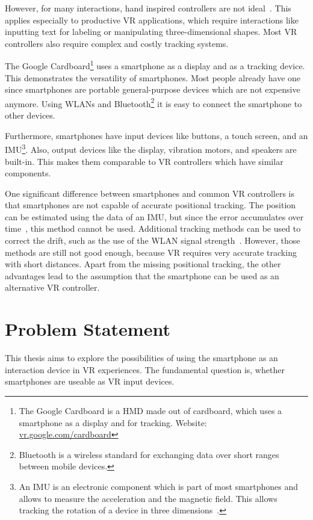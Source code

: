 However, for many interactions, hand inspired controllers are not ideal~\cite{Bowman.2012}. This applies especially to productive \gls{VR} applications, which require interactions like inputting text for labeling or manipulating three-dimensional shapes. Most \gls{VR} controllers also require complex and costly tracking systems.

The Google Cardboard\footnote{The Google Cardboard is a \gls{HMD} made out of cardboard, which uses a smartphone as a display and for tracking. Website: \href{https://vr.google.com/cardboard/}{vr.google.com/cardboard}} uses a smartphone as a display and as a tracking device. This demonstrates the versatility of smartphones. Most people already have one since smartphones are portable general-purpose devices which are not expensive anymore. Using \glspl{WLAN} and Bluetooth\footnote{Bluetooth is a wireless standard for exchanging data over short ranges between mobile devices.} it is easy to connect the smartphone to other devices.

Furthermore, smartphones have input devices like buttons, a touch screen, and an \gls{IMU}\footnote{An IMU is an electronic component which is part of most smartphones and allows to measure the acceleration and the magnetic field. This allows tracking the rotation of a device in three dimensions~\cite[139]{Katzakis.2010}.}. Also, output devices like the display, vibration motors, and speakers are built-in. This makes them comparable to \gls{VR} controllers which have similar components.

One significant difference between smartphones and common \gls{VR} controllers is that smartphones are not capable of accurate positional tracking. The position can be estimated using the data of an \gls{IMU}, but since the error accumulates over time~\cite[44]{Steed.2013}, this method cannot be used. Additional tracking methods can be used to correct the drift, such as the use of the \gls{WLAN} signal strength~\cite{Zhang.2015}. However, those methods are still not good enough, because \gls{VR} requires very accurate tracking with short distances.
Apart from the missing positional tracking, the other advantages lead to the assumption that the smartphone can be used as an alternative \gls{VR} controller.


\section{Problem Statement}\label{section:problem-statement}
This thesis aims to explore the possibilities of using the smartphone as an interaction device in \gls{VR} experiences. The fundamental question is, whether smartphones are useable as \gls{VR} input devices.

